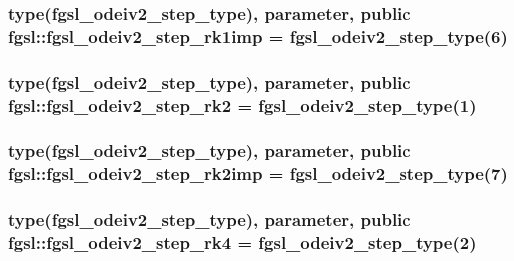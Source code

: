 \subsubsection[{fgsl\+\_\+odeiv2\+\_\+step\+\_\+rk1imp}]{\setlength{\rightskip}{0pt plus 5cm}type({\bf fgsl\+\_\+odeiv2\+\_\+step\+\_\+type}), parameter, public fgsl\+::fgsl\+\_\+odeiv2\+\_\+step\+\_\+rk1imp = {\bf fgsl\+\_\+odeiv2\+\_\+step\+\_\+type}(6)}\label{namespacefgsl_ae903b3c5e98a84868123fcf7f45cdf11}
\hypertarget{namespacefgsl_a3f76db1b3a7cdaa6b00e64515d6641b0}{}
\subsubsection[{fgsl\+\_\+odeiv2\+\_\+step\+\_\+rk2}]{\setlength{\rightskip}{0pt plus 5cm}type({\bf fgsl\+\_\+odeiv2\+\_\+step\+\_\+type}), parameter, public fgsl\+::fgsl\+\_\+odeiv2\+\_\+step\+\_\+rk2 = {\bf fgsl\+\_\+odeiv2\+\_\+step\+\_\+type}(1)}\label{namespacefgsl_a3f76db1b3a7cdaa6b00e64515d6641b0}
\hypertarget{namespacefgsl_a7b4cc51dc91d507009b26f542f372bbd}{}
\subsubsection[{fgsl\+\_\+odeiv2\+\_\+step\+\_\+rk2imp}]{\setlength{\rightskip}{0pt plus 5cm}type({\bf fgsl\+\_\+odeiv2\+\_\+step\+\_\+type}), parameter, public fgsl\+::fgsl\+\_\+odeiv2\+\_\+step\+\_\+rk2imp = {\bf fgsl\+\_\+odeiv2\+\_\+step\+\_\+type}(7)}\label{namespacefgsl_a7b4cc51dc91d507009b26f542f372bbd}
\hypertarget{namespacefgsl_a3d8617454e04b4450cc8c8f3101ff504}{}
\subsubsection[{fgsl\+\_\+odeiv2\+\_\+step\+\_\+rk4}]{\setlength{\rightskip}{0pt plus 5cm}type({\bf fgsl\+\_\+odeiv2\+\_\+step\+\_\+type}), parameter, public fgsl\+::fgsl\+\_\+odeiv2\+\_\+step\+\_\+rk4 = {\bf fgsl\+\_\+odeiv2\+\_\+step\+\_\+type}(2)}\label{namespacefgsl_a3d8617454e04b4450cc8c8f3101ff504}
\hypertarget{namespacefgsl_ac791c6691e1ebeae5e10c234a26737df}{}
